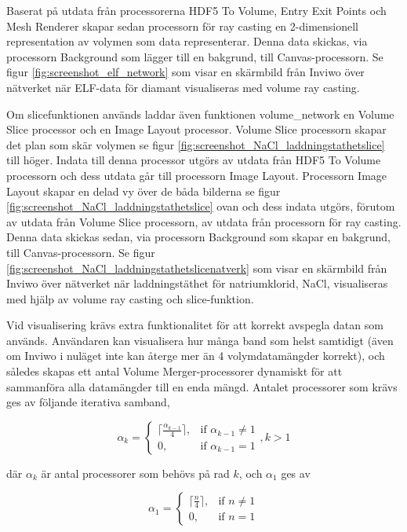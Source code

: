 \documentclass[a4paper,12pt]{article}
\begin{document}
Baserat på utdata från processorerna HDF5 To Volume, Entry Exit Points och Mesh Renderer skapar 
sedan processorn för ray casting en 2-dimensionell representation av volymen som data representerar. 
Denna data skickas, via processorn Background som lägger till en bakgrund, till Canvas-processorn. Se figur \ref{fig:screenshot_elf_network} som visar en skärmbild från Inviwo över nätverket när ELF-data för diamant visualiseras med volume ray casting.

Om slicefunktionen används laddar även funktionen volume\_network en Volume Slice processor och en Image Layout processor. Volume Slice processorn skapar det plan som skär volymen se figur \ref{fig:screenshot_NaCl_laddningstathetslice} till höger.
Indata till denna processor utgörs av utdata från HDF5 To Volume processorn och dess utdata 
går till processorn Image Layout. Processorn Image Layout skapar en delad vy över de båda bilderna 
se figur \ref{fig:screenshot_NaCl_laddningstathetslice}
ovan och dess indata utgörs, förutom av utdata från Volume Slice processorn, av utdata 
från processorn för ray casting. Denna data skickas sedan, via processorn Background som skapar en 
bakgrund, till Canvas-processorn. Se figur \ref{fig:screenshot_NaCl_laddningstathetslicenatverk} som visar en skärmbild från Inviwo över nätverket när laddningstäthet för natriumklorid, NaCl, visualiseras med hjälp av volume ray casting och slice-funktion.

Vid visualisering krävs extra funktionalitet för att korrekt avspegla datan som används. Användaren kan visualisera hur många band som helst samtidigt (även om Inviwo i nuläget inte kan återge mer än 4 volymdatamängder korrekt), och således skapas ett antal Volume Merger-processorer dynamiskt för att sammanföra alla datamängder till en enda mängd. Antalet processorer som krävs ges av följande iterativa samband,

\begin{equation}
\alpha_k = \begin{cases} 
\lceil{}\frac{\alpha_{k-1}}{4}\rceil{}, & \mbox{if } \alpha_{k-1}\neq{}1 \\
0, & \mbox{if } \alpha_{k-1}=1
\end{cases}
, k > 1
\end{equation}

där $\alpha_k$ är antal processorer som behövs på rad $k$, och $\alpha_1$ ges av

\begin{equation}
\alpha_1 = \begin{cases} 
\lceil{}\frac{n}{4}\rceil{}, & \mbox{if } n\neq{}1 \\
0, & \mbox{if } n=1
\end{cases}
\end{equation}
\end{document}

